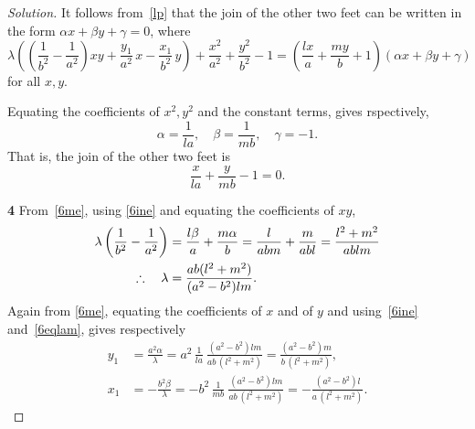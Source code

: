 \documentclass[11pt,a4paper]{report}
\theoremstyle{plain}
\theoremstyle{definition}
\begin{document}
\begin{proof}[Solution]
It follows from~\eqref{lp} that   the    join of the other two feet can be written in the form  $ \alpha x + \beta y + \gamma = 0 $, where
\begin{equation} \label{6me} 
\lambda \left(  \left( \frac{1}{b^2} - \frac{1}{a^2} \right) xy + \frac{y_1}{a^2}\, x - \frac{x_1}{b^2}\, y \right)
+  \dfrac{x^2}{a^2} + \dfrac{y^2}{b^2}  -1  = 
\left( \frac{l x}{a} + \frac{my}{b} + 1\right) \left( \alpha  x + \beta  y + \gamma \right)
\end{equation} 
for all $ x ,  y $.

Equating the coefficients of $ x^2, y^2 $ and the constant terms, gives rspectively,
\begin{equation} \label{6ine}
  \alpha = \frac{1}{la},\quad  \beta = \frac{1}{mb},  \quad      \gamma = -1. 
  \end{equation}
 That is, the join of the other two feet is
\begin{equation} \label{}
\frac{x}{la} + \frac{y}{mb} -1 = 0.
\end{equation} 

\bigskip 
\noindent \textbf{4} \quad From~\eqref{6me}, using \eqref{6ine} and equating the coefficients of $ xy $,
\begin{align} 
\lambda \left( \frac{1}{b^2} - \frac{1}{a^2} \right) &=\frac{l \beta }{a} + \frac{m \alpha }{b} 
	= \frac{l}{abm} + \frac{m}{abl} = \frac{l^2 + m^2}{ablm} \notag\\
\therefore \quad \lambda &= \frac{ab(l^2 + m^2)}{(a^2 - b^ 2)lm}. \label{6eqlam}
\end{align} 
 Again from \eqref{6me}, equating the coefficients of $ x $ and of $ y $ and using~\eqref{6ine} and~\eqref{6eqlam}, gives respectively
 \begin{equation} \label{6xy1}
 \begin{aligned}
 y_1 &= \frac{ a^2 \alpha}{ \lambda } =  a^2\, \frac{1}{ l a}\  \frac{(a^2 - b^2)lm }{ab\,  ( l^2 + m^2) }  
 	=  \frac{(a^2 - b^2) m }{ b\,  ( l^2 + m^2) },\\
x_1 &=  -\frac{ b^2 \beta }{ \lambda } =  -b^2\, \frac{1}{ mb}\  \frac{(a^2 - b^2)lm }{ab\,  ( l^2 + m^2) }  
 	=  -\frac{(a^2 - b^2) l }{ a\,  ( l^2 + m^2) }.
 \end{aligned}
 \end{equation} 
 \end{proof} 


\bigskip
\end{document}
